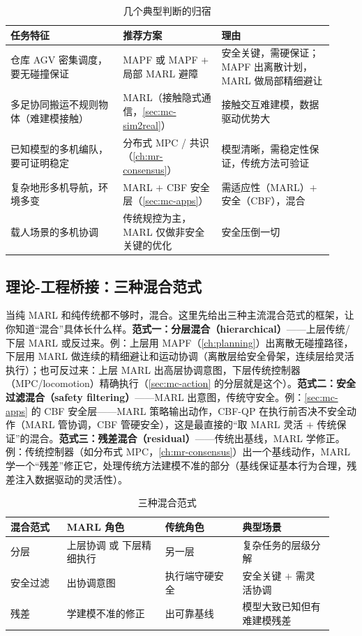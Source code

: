 \begin{table}[H]\centering\small
\caption{几个典型判断的归宿}
\label{tab:mc-selection}
\begin{tabular}{p{0.32\linewidth}p{0.28\linewidth}p{0.32\linewidth}}
\toprule
任务特征 & 推荐方案 & 理由 \\
\midrule
仓库 AGV 密集调度，要无碰撞保证 & MAPF 或 MAPF $+$ 局部 MARL 避障 & 安全关键，需硬保证；MAPF 出离散计划，MARL 做局部精细避让 \\
多足协同搬运不规则物体（难建模接触） & MARL（接触隐式通信，\cref{sec:mc-sim2real}） & 接触交互难建模，数据驱动优势大 \\
已知模型的多机编队，要可证明稳定 & 分布式 MPC / 共识（\cref{ch:mr-consensus}） & 模型清晰，需稳定性保证，传统方法可验证 \\
复杂地形多机导航，环境多变 & MARL $+$ CBF 安全层（\cref{sec:mc-apps}） & 需适应性（MARL）$+$ 安全（CBF），混合 \\
载人场景的多机协调 & 传统规控为主，MARL 仅做非安全关键的优化 & 安全压倒一切 \\
\bottomrule
\end{tabular}
\end{table}

\subsection{理论-工程桥接：三种混合范式}
\label{sec:mc-hybrid}

当纯 MARL 和纯传统都不够时，混合。这里先给出三种主流混合范式的框架，让你知道“混合”具体长什么样。\textbf{范式一：分层混合（hierarchical）}——上层传统/下层 MARL 或反过来。例：上层用 MAPF（\cref{ch:planning}）出离散无碰撞路径，下层用 MARL 做连续的精细避让和运动协调（离散层给安全骨架，连续层给灵活执行）；也可反过来：上层 MARL 出高层协调意图，下层传统控制器（MPC/locomotion）精确执行（\cref{sec:mc-action} 的分层就是这个）。\textbf{范式二：安全过滤混合（safety filtering）}——MARL 出意图，传统守安全。例：\cref{sec:mc-apps} 的 CBF 安全层——MARL 策略输出动作，CBF-QP 在执行前否决不安全动作（MARL 管协调，CBF 管硬安全），这是最直接的“取 MARL 灵活 $+$ 传统保证”的混合。\textbf{范式三：残差混合（residual）}——传统出基线，MARL 学修正。例：传统控制器（如分布式 MPC，\cref{ch:mr-consensus}）出一个基线动作，MARL 学一个“残差”修正它，处理传统方法建模不准的部分（基线保证基本行为合理，残差注入数据驱动的灵活性）。

\begin{table}[H]\centering\small
\caption{三种混合范式}
\label{tab:mc-hybrid}
\begin{tabular}{p{0.16\linewidth}p{0.28\linewidth}p{0.22\linewidth}p{0.26\linewidth}}
\toprule
混合范式 & MARL 角色 & 传统角色 & 典型场景 \\
\midrule
分层 & 上层协调 或 下层精细执行 & 另一层 & 复杂任务的层级分解 \\
安全过滤 & 出协调意图 & 执行端守硬安全 & 安全关键 $+$ 需灵活协调 \\
残差 & 学建模不准的修正 & 出可靠基线 & 模型大致已知但有难建模残差 \\
\bottomrule
\end{tabular}
\end{table}

